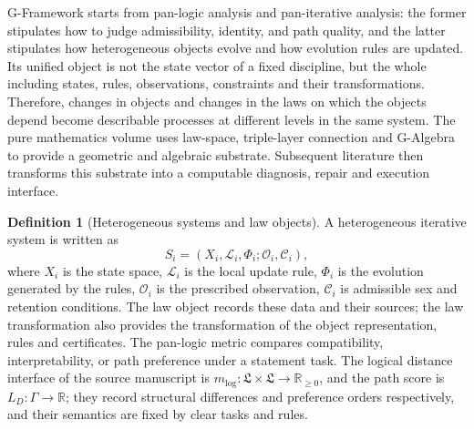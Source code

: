 \documentclass[11pt,a4paper]{article}
\theoremstyle{plain}
\theoremstyle{definition}
\newtheorem{definition}[theorem]{Definition}
\theoremstyle{remark}
\begin{document}
\begin{CJK*}
G-Framework starts from pan-logic analysis and pan-iterative analysis: the former stipulates how to judge admissibility, identity, and path quality, and the latter stipulates how heterogeneous objects evolve and how evolution rules are updated. Its unified object is not the state vector of a fixed discipline, but the whole including states, rules, observations, constraints and their transformations. Therefore, changes in objects and changes in the laws on which the objects depend become describable processes at different levels in the same system. The pure mathematics volume uses law-space, triple-layer connection and G-Algebra to provide a geometric and algebraic substrate. Subsequent literature then transforms this substrate into a computable diagnosis, repair and execution interface. \cite{S01,S05,S06,S10}

\begin{definition}
[Heterogeneous systems and law objects]\label{fa:def-lawsystem}
A heterogeneous iterative system is written as \[
 S_i=(X_i,\mathcal L_i,\Phi_i;\mathcal O_i,\mathcal C_i),
\] where $X_i$ is the state space, $\mathcal L_i$ is the local update rule, $\Phi_i$ is the evolution generated by the rules, $\mathcal O_i$ is the prescribed observation, $\mathcal C_i$ is admissible sex and retention conditions. The law object records these data and their sources; the law transformation also provides the transformation of the object representation, rules and certificates. The pan-logic metric compares compatibility, interpretability, or path preference under a statement task. The logical distance interface of the source manuscript is $m_{\mathrm{log}}:\mathfrak L\times\mathfrak L\to\mathbb R_{\ge0}$, and the path score is $L_D:\Gamma\to\mathbb R$; they record structural differences and preference orders respectively, and their semantics are fixed by clear tasks and rules.\end{definition}



\end{CJK*}
\end{document}
